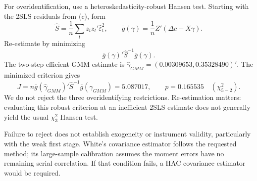 For overidentification, use a heteroskedasticity-robust Hansen test.
Starting with the 2SLS residuals from (c), form
\[
\widehat S=\frac1n\sum_t z_tz_t'\widehat\varepsilon_t^2,\qquad
\bar g(\gamma)=\frac1n Z'(\Delta c-X\gamma).
\]
Re-estimate by minimizing
\[
\bar g(\gamma)'\widehat S^{-1}\bar g(\gamma).
\]
The two-step efficient GMM estimate is
$\widehat\gamma_{GMM}=(0.00309653,0.35328490)'$.
The minimized criterion gives
\[
J=n\bar g(\widehat\gamma_{GMM})'\widehat S^{-1}
\bar g(\widehat\gamma_{GMM})
=5.087017,\qquad p=0.165535\quad(\chi^2_{5-2}).
\]
We do not reject the three overidentifying restrictions.
Re-estimation matters: evaluating this robust criterion at an
inefficient 2SLS estimate does not generally yield the usual
$\chi^2_3$ Hansen test.
\begin{table}[H]
\centering
\caption{Main specification tests}
\label{tab:tests}

\end{table}
Failure to reject does not establish exogeneity or instrument validity,
particularly with the weak first stage.
White's covariance estimator follows the requested method; its
large-sample calibration assumes the moment errors have no remaining
serial correlation. If that condition fails, a HAC covariance estimator
would be required.
